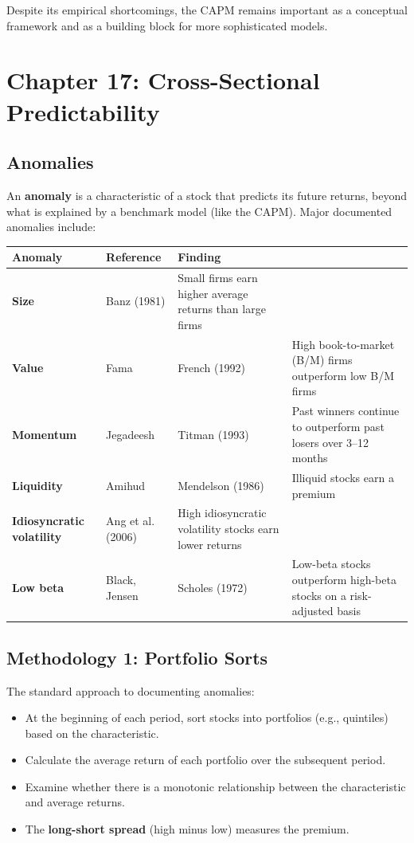 \documentclass[11pt,letterpaper]{report}
\begin{document}
Despite its empirical shortcomings, the CAPM remains important as a conceptual framework and as a building block for more sophisticated models.


\chapter{Chapter 17: Cross-Sectional Predictability}


\section{Anomalies}


An \textbf{anomaly} is a characteristic of a stock that predicts its future returns, beyond what is explained by a benchmark model (like the CAPM).  Major documented anomalies include:

\begin{center}
\begin{tabular}{lll}
\toprule
\textbf{Anomaly} & \textbf{Reference} & \textbf{Finding} \\
\midrule
\textbf{Size} & Banz (1981) & Small firms earn higher average returns than large firms \\
\textbf{Value} & Fama & French (1992) & High book-to-market (B/M) firms outperform low B/M firms \\
\textbf{Momentum} & Jegadeesh & Titman (1993) & Past winners continue to outperform past losers over 3--12 months \\
\textbf{Liquidity} & Amihud & Mendelson (1986) & Illiquid stocks earn a premium \\
\textbf{Idiosyncratic volatility} & Ang et al. (2006) & High idiosyncratic volatility stocks earn lower returns \\
\textbf{Low beta} & Black, Jensen & Scholes (1972) & Low-beta stocks outperform high-beta stocks on a risk-adjusted basis \\
\bottomrule
\end{tabular}
\end{center}


\section{Methodology 1: Portfolio Sorts}


The standard approach to documenting anomalies:

\begin{itemize}
  \item At the beginning of each period, sort stocks into portfolios (e.g., quintiles) based on the characteristic.
  \item Calculate the average return of each portfolio over the subsequent period.
  \item Examine whether there is a monotonic relationship between the characteristic and average returns.
  \item The \textbf{long-short spread} (high minus low) measures the premium.
\end{itemize}
\end{document}
